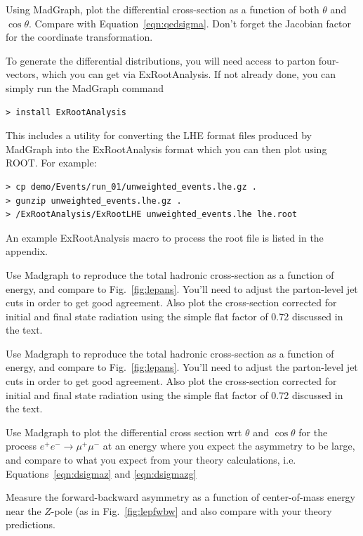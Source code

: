 \documentclass[12pt]{article}
\begin{document}
\begin{Exercise}
Using MadGraph, plot the differential cross-section as a function of both $\theta$ and $\cos\theta$.  Compare with Equation~\ref{eqn:qedsigma}. Don't forget the Jacobian factor for the coordinate transformation.

To generate the differential distributions, you will need access to parton four-vectors, which you can get via ExRootAnalysis.  If not already done, you can simply run the MadGraph command 
\begin{verbatim}
> install ExRootAnalysis
\end{verbatim}
This includes a utility for converting the LHE format files produced by MadGraph into the ExRootAnalysis format which you can then plot using ROOT.  For example:
\begin{verbatim}
> cp demo/Events/run_01/unweighted_events.lhe.gz .
> gunzip unweighted_events.lhe.gz .
> /ExRootAnalysis/ExRootLHE unweighted_events.lhe lhe.root
\end{verbatim}
\end{Exercise}
An example ExRootAnalysis macro to process the root file is listed in the appendix.  

\begin{Exercise}
Use Madgraph to reproduce the total hadronic cross-section as a function of energy, and compare to Fig.~\ref{fig:lepans}.
You'll need to adjust the parton-level jet cuts in order to get good agreement.  Also plot the cross-section corrected for initial and final state radiation using the simple flat factor of 0.72 discussed in the text.
\end{Exercise}

\begin{Exercise}
Use Madgraph to reproduce the total hadronic cross-section as a function of energy, and compare to Fig.~\ref{fig:lepans}.
You'll need to adjust the parton-level jet cuts in order to get good agreement.  Also plot the cross-section corrected for initial and final state radiation using the simple flat factor of 0.72 discussed in the text.
\end{Exercise}

\begin{Exercise}
Use Madgraph to plot the differential cross section wrt $\theta$ and $\cos \theta$ for the process $e^+ e^- \to \mu^+ \mu^-$ at an energy where you expect the asymmetry to be large, and compare to what you expect from your theory calculations, i.e. Equations~\ref{eqn:dsigmaz} and \ref{eqn:dsigmazg}

Measure the forward-backward asymmetry as a function of center-of-mass energy near the $Z$-pole (as in Fig.~\ref{fig:lepfwbw} and also compare with your theory predictions.

\end{Exercise}
\end{document}
